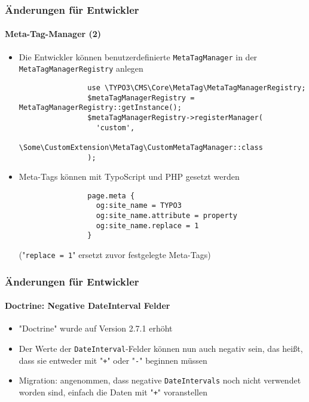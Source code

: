 \begin{frame}[fragile]
	\frametitle{Änderungen für Entwickler}
	\framesubtitle{Meta-Tag-Manager (2)}

	\lstset{basicstyle=\tiny\ttfamily}

	\begin{itemize}
		\item Die Entwickler können benutzerdefinierte \texttt{MetaTagManager} in der
			\texttt{MetaTagManagerRegistry} anlegen

			\begin{lstlisting}
				use \TYPO3\CMS\Core\MetaTag\MetaTagManagerRegistry;
				$metaTagManagerRegistry = MetaTagManagerRegistry::getInstance();
				$metaTagManagerRegistry->registerManager(
				  'custom',
				  \Some\CustomExtension\MetaTag\CustomMetaTagManager::class
				);
			\end{lstlisting}

		\item Meta-Tags können mit TypoScript und PHP gesetzt werden

			\begin{lstlisting}
				page.meta {
				  og:site_name = TYPO3
				  og:site_name.attribute = property
				  og:site_name.replace = 1
				}
			\end{lstlisting}

			\smaller
				("\texttt{replace = 1}" ersetzt zuvor festgelegte Meta-Tags)
			\normalsize

	\end{itemize}

\end{frame}


\begin{frame}[fragile]
	\frametitle{Änderungen für Entwickler}
	\framesubtitle{Doctrine: Negative DateInterval Felder}

	\begin{itemize}
		\item "Doctrine" wurde auf Version 2.7.1 erhöht
		\item Der Werte der \texttt{DateInterval}-Felder können nun auch negativ sein, 
			das heißt, dass sie entweder mit "\texttt{+}" oder "\texttt{-}" beginnen müssen
		\item Migration: angenommen, dass negative \texttt{DateIntervals} noch nicht verwendet worden sind,
			einfach die Daten mit "\texttt{+}" voranstellen
	\end{itemize}

	\breakingchange

\end{frame}

